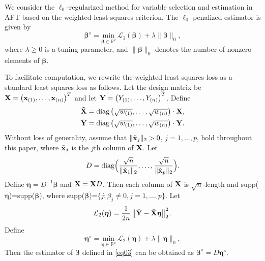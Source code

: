 \documentclass[12pt]{article}
\newcommand{\bX}{{\bf X}}
\newcommand{\bx}{\mbox{\bf x}}
\newcommand{\bY}{\mbox{\bf Y}}
\newcommand{\bbeta}{\boldsymbol{\beta}}
\newcommand{\boldeta}{\boldsymbol{\eta}}
\begin{document}
We consider the $\ell_0$-regularized method for variable selection and estimation in AFT based on the weighted least squares criterion.
The $\ell_0$-penalized estimator is given by
\begin{equation}\label{eq03}
\bbeta^{\diamond}=
\underset{\bbeta\in \mathbb{R}^p}{\mbox{min}}~
{\mathcal L}_1(\bbeta)+
\lambda\|\bbeta\|_0,
\end{equation}
where $\lambda \ge 0$ is a tuning parameter, and  $\|\bbeta\|_0$ denotes the number of nonzero elements of $\bbeta$.


To facilitate computation, we rewrite the weighted least squares loss as a standard least squares loss as follows. Let the design matrix be $\bX=\left(\bx_{(1)},\ldots,\bx_{(n)}\right)^T$ and let $\bY=\left(Y_{(1)},\ldots,Y_{(n)}\right)^T$. Define
\begin{equation*}
\begin{split}
&\tilde{\bX}=\mbox{diag}\left(\sqrt{w_{(1)}},\ldots,\sqrt{w_{(n)}}\right)\cdot\bX,\\
&\bar{\bY}=\mbox{diag}\left(\sqrt{w_{(1)}},\ldots,\sqrt{w_{(n)}}\right)\cdot \bY.
\end{split}
\end{equation*}
Without loss of generality, assume that $\|\tilde{\bx}_{j}\|_2>0$, $j=1,\ldots,p$, hold throughout this paper, where $\tilde{\bx}_{j}$ is the $j$th column of $\tilde{\bX}$. Let
 \begin{equation*}
D=\mbox{diag}\Big{(}\frac{\sqrt{n}}
{\|\tilde{\bx}_{1}\|_2},\ldots,\frac{\sqrt{n}}{\|\tilde{\bx}_{p}\|_2}\Big{)}.
\end{equation*}
Define
$\boldeta=D^{-1}\bbeta$ and $\bar{\bX}=\tilde{\bX} D$.
Then  each column of $\bar{\bX}$ is $\sqrt{n}$-length and supp($\boldeta$)=supp($\bbeta$), where supp($\bbeta$)=$\{j: \beta_j\neq 0, j=1,\ldots,p\}$.
Let
\[
\mathcal{L}_2(\boldeta)=\frac{1}{2n}\left\|\bar{\bY}-\bar{\bX}\boldeta\right\|_2^2.
\]
Define
\begin{equation}\label{eq1}
\boldeta^{\diamond}=\underset{\boldeta\in \mathbb{R}^p}{\mbox{min}}~
\mathcal{L}_2(\boldeta)
+\lambda\|\boldeta\|_0,
\end{equation}
Then the estimator of $\bbeta$ defined in \eqref{eq03} can be obtained as
$\bbeta^{\diamond}=D \boldeta^{\diamond}.$


\end{document}

